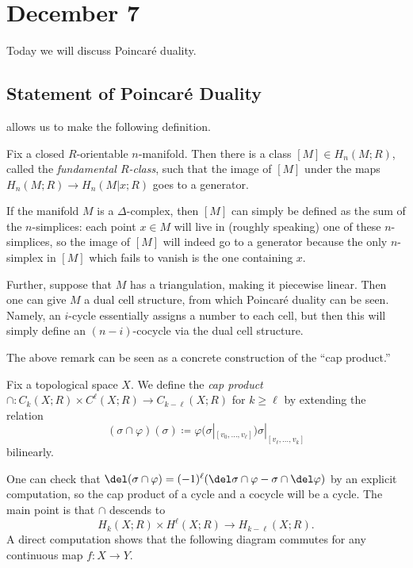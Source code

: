 \documentclass[../notes.tex]{subfiles}
\begin{document}
\section{December 7}

Today we will discuss Poincar\'e duality.

\subsection{Statement of Poincar\'e Duality}
 allows us to make the following definition.
\begin{definition}
	Fix a closed $R$-orientable $n$-manifold. Then there is a class $[M]\in H_n(M;R)$, called the \textit{fundamental $R$-class}, such that the image of $[M]$ under the maps $H_n(M;R)\to H_n(M|x;R)$ goes to a generator.
\end{definition}
\begin{remark}
	If the manifold $M$ is a $\Delta$-complex, then $[M]$ can simply be defined as the sum of the $n$-simplices: each point $x\in M$ will live in (roughly speaking) one of these $n$-simplices, so the image of $[M]$ will indeed go to a generator because the only $n$-simplex in $[M]$ which fails to vanish is the one containing $x$.
\end{remark}
\begin{remark}
	Further, suppose that $M$ has a triangulation, making it piecewise linear. Then one can give $M$ a dual cell structure, from which Poincar\'e duality can be seen. Namely, an $i$-cycle essentially assigns a number to each cell, but then this will simply define an $(n-i)$-cocycle via the dual cell structure.
\end{remark}
The above remark can be seen as a concrete construction of the ``cap product.''
\begin{definition}
	Fix a topological space $X$. We define the \textit{cap product} $\cap\colon C_k(X;R)\times C^\ell(X;R)\to C_{k-\ell}(X;R)$ for $k\ge\ell$ by extending the relation
	\[(\sigma\cap\varphi)(\sigma)\coloneqq\varphi(\sigma|_{[v_0,\ldots,v_\ell]})\sigma|_{[v_\ell,\ldots,v_k]}\]
	bilinearly.
\end{definition}
One can check that $\del(\sigma\cap\varphi)=(-1)^\ell(\del\sigma\cap\varphi-\sigma\cap\del\varphi)$ by an explicit computation, so the cap product of a cycle and a cocycle will be a cycle. The main point is that $\cap$ descends to
\[H_k(X;R)\times H^\ell(X;R)\to H_{k-\ell}(X;R).\]
A direct computation shows that the following diagram commutes for any continuous map $f\colon X\to Y$.
\end{document}
